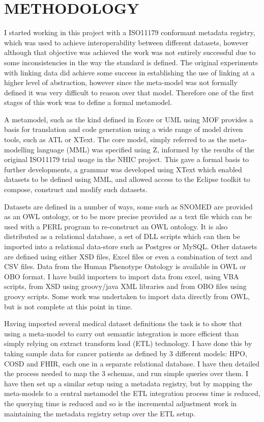 \documentclass[a4paper,twoside]{article}
\begin{document}
\section{\uppercase{METHODOLOGY}}

\noindent I started working in this project with a ISO11179 conformant metadata registry, which was used to achieve interoperability between different datasets, however although that objective was achieved the work was not entirely successful due to some inconsistencies in the way the standard is defined.  The original experiments with linking data did achieve some success in establishing the use of linking at a higher level of abstraction, however since the meta-model was not formally defined it was very difficult to reason over that model. Therefore one of the first stages of this work was to define a formal metamodel.

A metamodel, such as the kind defined in Ecore or UML using MOF provides a basis for translation and code generation using a wide range of model driven tools, such as ATL or XText. The core model, simply referred to as the meta-modelling language (MML) was specified using Z, informed by the results of the original ISO11179 trial usage in the NHIC project. This gave a formal basis to further developments, a grammar was developed using XText which enabled datasets to be defined using MML, and allowed access to the Eclipse toolkit to compose, construct and modify such datasets. 



Datasets are defined in a number of ways, some such as SNOMED are provided as an OWL ontology, or to be more precise provided as a text file which can be used with a PERL program to re-construct an OWL ontology. It is also distributed as a relational database, a set of DLL scripts which can then be imported into a relational data-store such as Postgres or MySQL. Other datasets are defined using either XSD files, Excel files or even a combination of text and CSV files. Data from the Human Phenotype Ontology is available in OWL or OBO format. I have build importers to import data from excel, using VBA scripts, from XSD using groovy/java XML libraries and from OBO files using groovy scripts. Some work was undertaken to import data directly from OWL, but is not complete at this point in time.

Having imported several medical dataset definitions the task is to show that using a meta-model to carry out semantic integration is more efficient than simply relying on extract transform load (ETL) technology. I have done this by taking sample data for cancer patients as defined by 3 different models: HPO, COSD and FHIR, each one in a separate relational database. I have then detailed the process needed to map the 3 schemas, and run simple queries over them. I have then set up a similar setup using a metadata registry, but by mapping the meta-models to a central metamodel the ETL integration process time is reduced, the querying time is reduced and so is the incremental adjustment work in maintaining the metadata registry setup over the ETL setup.
\end{document}
